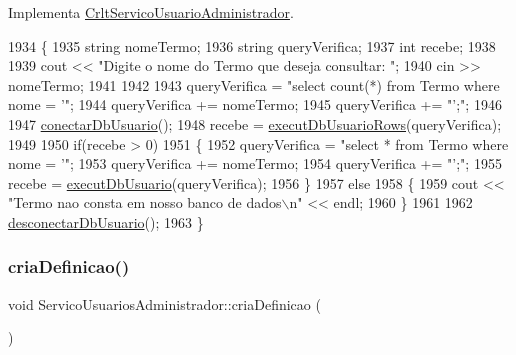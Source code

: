 Implementa \mbox{\hyperlink{class_crlt_servico_usuario_administrador_a6924f2f9e7b9b80ddc1be753628fe989}{Crlt\+Servico\+Usuario\+Administrador}}.


\begin{DoxyCode}
1934 \{
1935   \textcolor{keywordtype}{string} nomeTermo;
1936   \textcolor{keywordtype}{string} queryVerifica;
1937   \textcolor{keywordtype}{int} recebe;
1938 
1939   cout << \textcolor{stringliteral}{"Digite o nome do Termo que deseja consultar: "};
1940   cin >> nomeTermo;
1941 
1942 
1943   queryVerifica = \textcolor{stringliteral}{"select count(*) from Termo where nome = '"};
1944   queryVerifica += nomeTermo;
1945   queryVerifica += \textcolor{stringliteral}{"';"};
1946 
1947   \mbox{\hyperlink{comando_sql_8cpp_a4f89ddcbc4cf8f2587d89f72f8c7900d}{conectarDbUsuario}}();
1948   recebe = \mbox{\hyperlink{comando_sql_8cpp_af54952694f2fa7d76f969fb74b853cb9}{executDbUsuarioRows}}(queryVerifica);
1949 
1950   \textcolor{keywordflow}{if}(recebe > 0)
1951       \{
1952         queryVerifica = \textcolor{stringliteral}{"select * from Termo where nome = '"};
1953         queryVerifica += nomeTermo;
1954         queryVerifica += \textcolor{stringliteral}{"';"};
1955         recebe = \mbox{\hyperlink{comando_sql_8cpp_a748197580e7f9acdbf48c78de1f7924b}{executDbUsuario}}(queryVerifica);
1956       \}
1957   \textcolor{keywordflow}{else}
1958       \{
1959         cout << \textcolor{stringliteral}{"Termo nao consta em nosso banco de dados\(\backslash\)n"} << endl;
1960       \}
1961 
1962       \mbox{\hyperlink{comando_sql_8cpp_a969be9911913568e30d4ae8963338bc3}{desconectarDbUsuario}}();
1963 \}
\end{DoxyCode}
\mbox{\label{class_servico_usuarios_administrador_a10298cc0f8e8c1b6f44363747bc8de1e}} 
\subsubsection{\texorpdfstring{cria\+Definicao()}{criaDefinicao()}}
{\footnotesize\ttfamily void Servico\+Usuarios\+Administrador\+::cria\+Definicao (\begin{DoxyParamCaption}{ }\end{DoxyParamCaption})\hspace{0.3cm}{\ttfamily [virtual]}}



